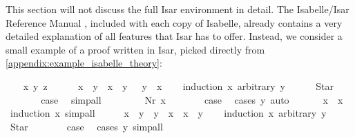 This section will not discuss the full Isar environment in detail. The Isabelle/Isar Reference Manual \cite{wenzel-isabelle_isar}, included with each copy of Isabelle, already contains a very detailed explanation of all features that Isar has to offer. Instead, we consider a small example of a proof written in Isar, picked directly from \cref{appendix:example_isabelle_theory}:
\vspace{1em}\begin{isabellebody}
\isatagproof
{}\isamarkupfalse%
\isanewline
\ \ \isamarkupfalse%
\ x\ y\ z\ {\isacharcolon}{\isacharcolon}\ {\isasymM}\isanewline
\ \ \isamarkupfalse%
\ {\isachardoublequoteopen}{\isacharparenleft}x\ {\isacharless}\ y{\isacharparenright}\ {\isacharequal}\ {\isacharparenleft}x\ {\isasymle}\ y\ {\isasymand}\ {\isasymnot}\ y\ {\isasymle}\ x{\isacharparenright}{\isachardoublequoteclose}\isanewline
\ \ \isamarkupfalse%
\ {\isacharparenleft}induction\ x\ arbitrary{\isacharcolon}\ y{\isacharparenright}\isanewline
\ \ \ \ \isamarkupfalse%
\ Star\isanewline
\ \ \ \ \isamarkupfalse%
\ \isamarkupfalse%
\ {\isacharquery}case\ \isamarkupfalse%
\ simp{\isacharunderscore}all\isanewline
\ \ \isamarkupfalse%
\isanewline
\ \ \ \ \isamarkupfalse%
\ {\isacharparenleft}Nr\ x{\isacharparenright}\isanewline
\ \ \ \ \isamarkupfalse%
\ \isamarkupfalse%
\ {\isacharquery}case\ \isamarkupfalse%
\ {\isacharparenleft}cases\ y{\isacharparenright}\ auto\isanewline
\ \ \isamarkupfalse%
\isanewline
\isanewline
\ \ \isamarkupfalse%
\ {\isachardoublequoteopen}x\ {\isasymle}\ x{\isachardoublequoteclose}\ \isamarkupfalse%
\ {\isacharparenleft}induction\ x{\isacharparenright}\ simp{\isacharunderscore}all\isanewline
\ \ \isamarkupfalse%
\ \isamarkupfalse%
\ {\isachardoublequoteopen}x\ {\isasymle}\ y\ {\isasymLongrightarrow}\ y\ {\isasymle}\ x\ {\isasymLongrightarrow}\ x\ {\isacharequal}\ y{\isachardoublequoteclose}\isanewline
\ \ \isamarkupfalse%
\ {\isacharparenleft}induction\ x\ arbitrary{\isacharcolon}\ y{\isacharparenright}\isanewline
\ \ \ \ \isamarkupfalse%
\ Star\isanewline
\ \ \ \ \isamarkupfalse%
\ \isamarkupfalse%
\ {\isacharquery}case\ \isamarkupfalse%
\ {\isacharparenleft}cases\ y{\isacharparenright}\ simp{\isacharunderscore}all\isanewline

\end{isabellebody}
